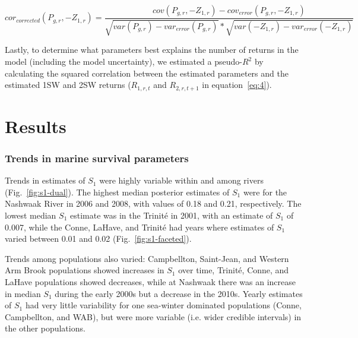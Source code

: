 \documentclass[12pt]{article}
\newcommand{\So}{$S_{1}$\xspace}
\begin{document}
\begin{equation}
cor_{corrected}(P_{g,r},-Z_{1,r}) = \frac{cov(P_{g,r}, -Z_{1,r}) - cov_{error}(P_{g,r}, -Z_{1,r})}
{\sqrt{var(P_{g,r})- var_{error}(P_{g,r})}*\sqrt{var(-Z_{1,r}) - var_{error}(-Z_{1,r})}}\label{eq:corparam}
\end{equation}

Lastly, to determine what parameters best explains the number of returns in
the model (including the model uncertainty), we estimated a pseudo-$R^2$ by
calculating the squared correlation between the estimated parameters and the
estimated 1SW and 2SW returns ($R_{1,r,t}$ and $R_{2,r,t+1}$ in
equation~\ref{eq:4}).



\section*{Results}


\subsubsection*{Trends in marine survival parameters}

Trends in estimates of \So were highly variable within and among rivers
(Fig.~\ref{fig:s1-dual}). The highest median posterior estimates of \So
were for the Nashwaak River in 2006 and 2008, with values of 0.18 and 0.21,
respectively. The lowest median \So estimate was in the Trinit\'{e} in 2001,
with an estimate of \So of 0.007, while the Conne, LaHave, and Trinit\'{e} had
years where estimates of \So varied between 0.01 and 0.02 (Fig.~\ref{fig:s1-faceted}).

Trends among populations also varied: Campbellton,
Saint-Jean, and Western Arm Brook populations showed increases in \So
over time, Trinit\'{e}, Conne, and LaHave populations showed decreases,
while at Nashwaak there was an increase in median \So during the early
2000s but a decrease in the 2010s. Yearly estimates of \So had very little
variability for one sea-winter dominated populations (Conne, Campbellton, and
WAB), but were more variable (i.e. wider credible intervals) in the other
populations.
\end{document}
